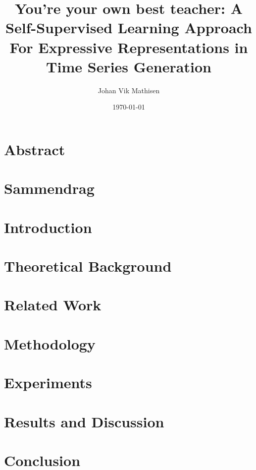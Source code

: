 \documentclass[british,titlepage]{ntnuthesis}
\title{You're your own best teacher: A Self-Supervised Learning Approach For Expressive Representations in Time Series Generation}
\author{Johan Vik Mathisen}
\date{\today}
\begin{document}
\chapter*{Abstract}

\chapter*{Sammendrag}



%

\tableofcontents


\chapter{Introduction}


\chapter{Theoretical Background}


\chapter{Related Work}


\chapter{Methodology}


\chapter{Experiments}


\chapter{Results and Discussion}


\chapter{Conclusion}


\chapter*{\bibname}
\printbibliography[heading=none]



\appendix

\end{document}

